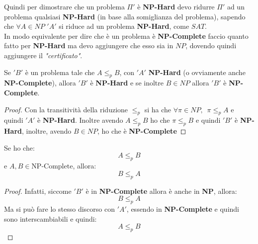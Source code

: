 						Quindi per dimostrare che un problema $\Pi'$ è \textbf{NP-Hard} devo ridurre
						$\Pi'$ ad un problema qualsiasi \textbf{NP-Hard} (in base alla somiglianza del
						problema), sapendo che $\forall A\in NP$ $ 'A' $ si riduce ad un problema
						\textbf{NP-Hard}, come $SAT$.\\
						In modo equivalente per dire che è un problema è \textbf{NP-Complete} faccio
						quanto fatto per \textbf{NP-Hard} ma devo aggiungere che esso sia in $NP$,
						dovendo quindi aggiungere il \textit{"certificato"}.
						\begin{definizione}
							Se $ 'B' $ è un problema tale che $A\leq_p B$, con $ 'A' $
							\textbf{NP-Hard} (o ovviamente anche \textbf{NP-Complete}), allora $ 'B' $ è
							\textbf{NP-Hard} e se inoltre $B\in NP$ allora $ 'B' $ è \textbf{NP-Complete}.  
							\begin{proof}
								Con la transitività della riduzione $\leq_p$ si ha che $\forall\pi\in
								NP,\,\,\, \pi\leq_p A$ e quindi $ 'A' $ è \textbf{NP-Hard}. Inoltre avendo
								$A\leq_p B$ ho che  $\pi\leq_p B$ e quindi $ 'B' $ è \textbf{NP-Hard}, inoltre,
								avendo $B\in NP$, ho che è \textbf{NP-Complete}
							\end{proof}
						\end{definizione}
						\begin{definizione}
							Se ho che:
							\[A\leq_p B\]
							e $A,B\in \mbox{NP-Complete}$, allora:
							\[B\leq_p A\]
							\begin{proof}
								Infatti, siccome $ 'B' $ è in \textbf{NP-Complete} allora è anche in \textbf{NP},
								allora: 
								\[B\leq_p A\]
								Ma si può fare lo stesso discorso con $ 'A' $, essendo in \textbf{NP-Complete} e
								quindi sono interscambiabili e quindi:
								\[A\leq_p B\]
							\end{proof}
						\end{definizione}
						
